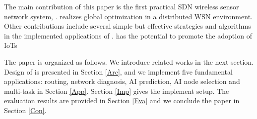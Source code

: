 The main contribution of this paper is the first 
practical SDN wireless sensor network system, {\sdn}. 
{\sdn} realizes global optimization in a distributed WSN environment.
Other contributions include several simple but effective strategies and algorithms 
in the implemented applications of {\sdn}. {\sdn} has the potential to promote the adoption of IoTs



The paper is organized as follows. We introduce related works in the next section. 
Design of {\sdn} is presented in Section \ref{Arc}, 
and we implement five fundamental applications: routing, network diagnosis, 
AI prediction, AI node selection and multi-task in Section \ref{App}. 
Section \ref{Imp} gives the implement setup.
The evaluation results are provided in Section \ref{Eva} 
and we conclude the paper in Section \ref{Con}.

